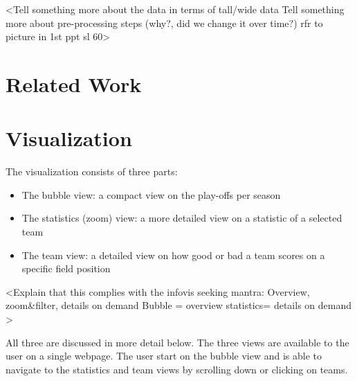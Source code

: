 \documentclass{sigchi}
\begin{document}
<Tell something more about the data in terms of tall/wide data
Tell something more about pre-processing steps (why?, did we change it over time?)
rfr to picture in 1st ppt sl 60>
\section{Related Work}\label{sec:literature}


\section{Visualization}\label{sec:visualization}
The visualization consists of three parts:
\begin{itemize}
    \item The bubble view: a compact view on the play-offs per season
    \item The statistics (zoom) view: a more detailed view on a statistic of a selected team
    \item The team view: a detailed view on how good or bad a team scores on a specific field position
\end{itemize}

<Explain that this complies with the infovis seeking mantra: Overview, zoom&filter, details on demand
Bubble = overview
statistics= details on demand
>

All three are discussed in more detail below. The three views are available to
the user on a single webpage. The user start on the bubble view and is able to
navigate to the statistics and team views by scrolling down or clicking on
teams.
\end{document}
